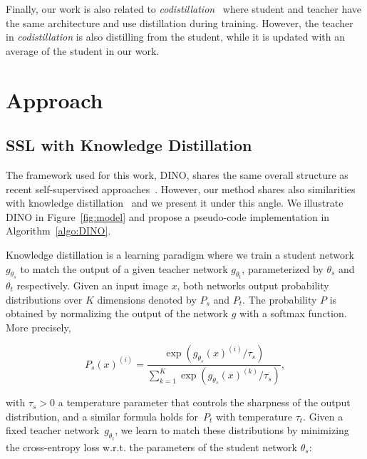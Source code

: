 Finally, our work is also related to \textit{codistillation}~\cite{anil2018large} where student and teacher have the same architecture and use distillation during training. However, the teacher in \textit{codistillation} is also distilling from the student, while it is updated with an average of the student in our work.

\section{Approach}
\subsection{SSL with Knowledge Distillation}
\label{sec:method}

The framework used for this work, DINO, shares the same overall structure as recent self-supervised approaches~\cite{caron2020unsupervised,chen2020exploring,chen2020simple,grill2020bootstrap,he2020momentum}. However, our method shares also similarities with knowledge distillation~\cite{hinton2015distilling} and we present it under this angle. We illustrate DINO in Figure~\ref{fig:model} and propose a pseudo-code implementation in Algorithm~\ref{algo:DINO}.

Knowledge distillation is a learning paradigm where we train a student network $g_{\theta_s}$ to match the output of a given teacher network $g_{\theta_t}$, parameterized by $\theta_s$ and $\theta_t$ respectively. Given an input image $x$, both networks output probability distributions over $K$ dimensions denoted by $P_s$ and $P_t$. The probability $P$ is obtained by normalizing the output of the network $g$ with a softmax function. More precisely,

\begin{equation}
  P_s(x)^{(i)} = \frac{\exp(g_{\theta_s}(x)^{(i)} / \tau_s)}{\sum_{k=1}^K \exp(g_{\theta_s}(x)^{(k)} / \tau_s)},
\end{equation}

                                                                                                                                                                                        
with $\tau_s>0$ a temperature parameter that controls the sharpness of the output distribution, and a similar formula holds for~$P_t$ with temperature $\tau_t$.
Given a fixed teacher network~$g_{\theta_t}$, we learn to match these distributions by minimizing the cross-entropy loss w.r.t. the parameters of the student network $\theta_s$:


